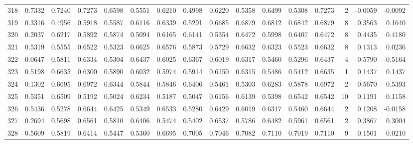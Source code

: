 \begin{tabular}{lrrrrrrrrrrrrrrr}
318 &      0.7332 &  0.7240 &  0.7273 &  0.6598 &  0.5551 &  0.6210 &  0.4998 &  0.6220 &  0.5358 &  0.6499 &   0.5308 &     0.7273 &      2 &                   -0.0059 &                    -0.0092 \\
319 &      0.3316 &  0.4956 &  0.5918 &  0.5587 &  0.6116 &  0.6339 &  0.5291 &  0.6685 &  0.6879 &  0.6812 &   0.6842 &     0.6879 &      8 &                    0.3563 &                     0.1640 \\
320 &      0.2037 &  0.6217 &  0.5892 &  0.5874 &  0.5094 &  0.6165 &  0.6141 &  0.5354 &  0.6472 &  0.5998 &   0.6407 &     0.6472 &      8 &                    0.4435 &                     0.4180 \\
321 &      0.5319 &  0.5555 &  0.6522 &  0.5323 &  0.6625 &  0.6576 &  0.5873 &  0.5729 &  0.6632 &  0.6323 &   0.5523 &     0.6632 &      8 &                    0.1313 &                     0.0236 \\
322 &      0.0647 &  0.5811 &  0.6334 &  0.5304 &  0.6437 &  0.6025 &  0.6367 &  0.6019 &  0.6317 &  0.5460 &   0.5296 &     0.6437 &      4 &                    0.5790 &                     0.5164 \\
323 &      0.5198 &  0.6635 &  0.6300 &  0.5890 &  0.6032 &  0.5974 &  0.5914 &  0.6150 &  0.6315 &  0.5486 &   0.5412 &     0.6635 &      1 &                    0.1437 &                     0.1437 \\
324 &      0.1302 &  0.6695 &  0.6972 &  0.6344 &  0.5844 &  0.5846 &  0.6406 &  0.5461 &  0.5303 &  0.6283 &   0.5878 &     0.6972 &      2 &                    0.5670 &                     0.5393 \\
325 &      0.5351 &  0.6509 &  0.5192 &  0.5024 &  0.6234 &  0.5187 &  0.5047 &  0.6156 &  0.6139 &  0.5398 &   0.6542 &     0.6542 &     10 &                    0.1191 &                     0.1158 \\
326 &      0.5436 &  0.5278 &  0.6644 &  0.6425 &  0.5349 &  0.6533 &  0.5280 &  0.6429 &  0.6019 &  0.6317 &   0.5460 &     0.6644 &      2 &                    0.1208 &                    -0.0158 \\
327 &      0.2694 &  0.5698 &  0.6561 &  0.5810 &  0.6406 &  0.5474 &  0.5402 &  0.6537 &  0.5786 &  0.6482 &   0.5961 &     0.6561 &      2 &                    0.3867 &                     0.3004 \\
328 &      0.5609 &  0.5819 &  0.6414 &  0.5447 &  0.5360 &  0.6695 &  0.7005 &  0.7046 &  0.7082 &  0.7110 &   0.7019 &     0.7110 &      9 &                    0.1501 &                     0.0210 \\

\end{tabular}
